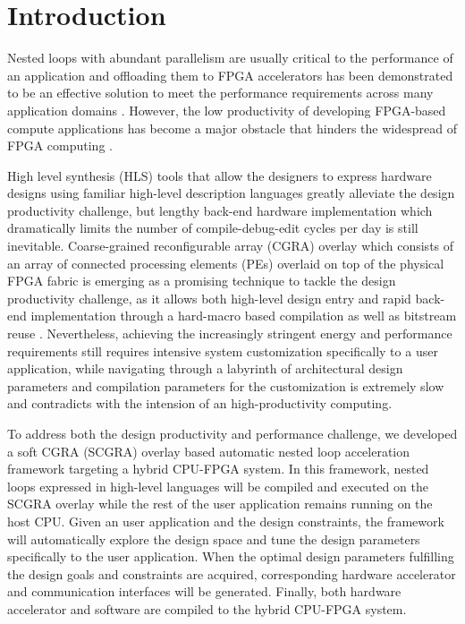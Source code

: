 \section{Introduction}
Nested loops with abundant parallelism are usually 
critical to the performance of an application and offloading them to 
FPGA accelerators has been demonstrated to be an effective 
solution to meet the performance requirements across many 
application domains \cite{Chung2010}. However, the low productivity 
of developing FPGA-based compute applications has become a major obstacle 
that hinders the widespread of FPGA computing \cite{cong2011high}.

High level synthesis (HLS) tools that allow the designers to express hardware 
designs using familiar high-level description languages greatly alleviate the 
design productivity challenge, but lengthy back-end hardware implementation 
which dramatically limits the number of compile-debug-edit cycles per day is 
still inevitable. Coarse-grained reconfigurable array (CGRA) overlay 
which consists of an array of connected processing elements (PEs) overlaid 
on top of the physical FPGA fabric is emerging as a promising technique to tackle 
the design productivity challenge, as it allows both high-level design entry and 
rapid back-end implementation through a hard-macro based compilation 
\cite{ROB2014} as well as bitstream reuse \cite{scgra-orig}. Nevertheless, 
achieving the increasingly stringent energy and performance requirements 
still requires intensive system customization specifically to a user application, 
while navigating through a labyrinth of architectural design parameters and 
compilation parameters for the customization is extremely slow and contradicts 
with the intension of an high-productivity computing. 

To address both the design productivity and performance challenge, 
we developed a soft CGRA (SCGRA) overlay based 
automatic nested loop acceleration framework targeting a hybrid CPU-FPGA 
system. In this framework, nested loops expressed in high-level languages 
will be compiled and executed on the SCGRA overlay while the rest of the 
user application remains running on the host CPU.
Given an user application and the design constraints, the framework will
automatically explore the design space and tune the design parameters 
specifically to the user application. When the optimal design parameters 
fulfilling the design goals and constraints are acquired, 
corresponding hardware accelerator and communication interfaces 
will be generated. Finally, both hardware accelerator
and software are compiled to the hybrid CPU-FPGA system.  

